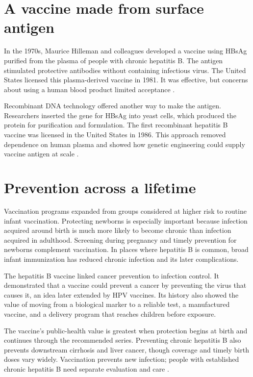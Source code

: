 \documentclass[12pt,oneside]{book}
\begin{document}
\section{A vaccine made from surface antigen}
In the 1970s, Maurice Hilleman and colleagues developed a vaccine using HBsAg purified from the plasma of people with chronic hepatitis B. The antigen stimulated protective antibodies without containing infectious virus. The United States licensed this plasma-derived vaccine in 1981. It was effective, but concerns about using a human blood product limited acceptance \cite{cdcHepBvaccine}.

Recombinant DNA technology offered another way to make the antigen.
Researchers inserted the gene for HBsAg into yeast cells, which produced the
protein for purification and formulation. The first recombinant hepatitis B
vaccine was licensed in the United States in 1986. This approach removed
dependence on human plasma and showed how genetic engineering could supply
vaccine antigen at scale \cite{cdcHepBvaccine,cdcHepBacip}.

\section{Prevention across a lifetime}
Vaccination programs expanded from groups considered at higher risk to routine infant vaccination. Protecting newborns is especially important because infection acquired around birth is much more likely to become chronic than infection acquired in adulthood. Screening during pregnancy and timely prevention for newborns complement vaccination. In places where hepatitis B is common, broad infant immunization has reduced chronic infection and its later complications.

The hepatitis B vaccine linked cancer prevention to infection control. It
demonstrated that a vaccine could prevent a cancer by preventing the virus
that causes it, an idea later extended by HPV vaccines. Its history also
showed the value of moving from a biological marker to a reliable test, a
manufactured vaccine, and a delivery program that reaches children before
exposure.

The vaccine’s public-health value is greatest when protection begins at birth
and continues through the recommended series. Preventing chronic hepatitis B
also prevents downstream cirrhosis and liver cancer, though coverage and
timely birth doses vary widely. Vaccination prevents new infection; people
with established chronic hepatitis B need separate evaluation and care
\cite{cdcHepBacip}.
\end{document}
